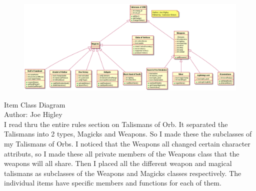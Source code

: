 \documentclass[12pt,letterpaper]{scrreprt}
\begin{document}
\begin{figure}[ht!]
\centering
\includegraphics[width=160mm]{Item Class Diagram.png}
\label{overflow}
\end{figure}

Item Class Diagram\\
Author: Joe Higley\\

I read thru the entire rules section on Talismans of Orb.  It separated the Talismans into 2 types, Magicks and Weapons. So I made these the subclasses of my Talismans of Orbs.  I noticed that the Weapons all changed certain character attributs, so I made these all private members of the Weapons class that the weapons will all share. Then I placed all the different weapon and magical talismans as subclasses of the Weapons and Magicks classes respectively. The individual items have specific members and functions for each of them.
\end{document}
